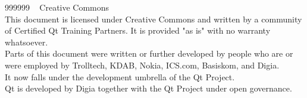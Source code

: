   \begin{slide}{999999}
    \vspace{1em}
    \textcopyright~ Creative Commons\\
    This document is licensed under Creative Commons and written by
    a community of Certified Qt Training
    Partners. It is provided "as is" with no warranty whatsoever. \\
    \vspace{.5em}
    Parts of this document were written or further developed by people
    who are or were employed by Trolltech, KDAB, Nokia, ICS.com,
    Basiskom, and Digia. \\
    It now falls under the development umbrella of the Qt Project. \\
    \vspace{.5em}
    Qt is developed by Digia together with the Qt Project under open
    governance.\\
    
  \end{slide}
